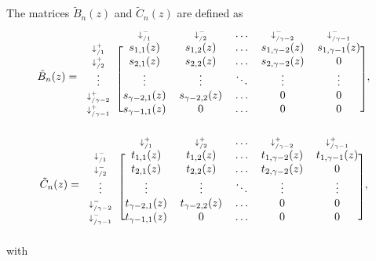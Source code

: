 \documentclass{article}
\begin{document}
The matrices $\tilde{B}_n(z)$ and $\tilde{C}_n(z)$ are defined as
\begin{equation*}
\tilde{B}_n(z) = 
\begin{blockarray}{cccccc}
   & \scriptstyle{\downarrow_{/1}^-} & \scriptstyle{\downarrow_{/2}^-} &
   \ldots & \scriptstyle{\downarrow_{/\gamma-2}^-} &
   \scriptstyle{\downarrow_{/\gamma-1}^-} \\
\begin{block}{c[ccccc]}
\scriptstyle{\downarrow_{/1}^+} & s_{1,1}(z) & s_{1,2}(z) &
    \ldots & s_{1,\gamma-2}(z) & s_{1,\gamma-1}(z) \\
\scriptstyle{\downarrow_{/2}^+} & s_{2,1}(z) & s_{2,2}(z) &
    \ldots & s_{2,\gamma-2}(z) & 0 \\
\vdots & \vdots & \vdots & \ddots & \vdots & \vdots \\
\scriptstyle{\downarrow_{/\gamma-2}^+} & s_{\gamma-2,1}(z) &
    s_{\gamma-2,2}(z) & \ldots & 0 & 0 \\
\scriptstyle{\downarrow_{/\gamma-1}^+} & s_{\gamma-1,1}(z) & 0 &
    \ldots & 0 & 0 \\
\end{block}
\end{blockarray},
\end{equation*}
\begin{equation*}
\tilde{C}_n(z) = 
\begin{blockarray}{cccccc}
   & \scriptstyle{\downarrow_{/1}^+} & \scriptstyle{\downarrow_{/2}^+} &
    \ldots & \scriptstyle{\downarrow_{/\gamma-2}^+} &
    \scriptstyle{\downarrow_{/\gamma-1}^+} \\
\begin{block}{c[ccccc]}
\scriptstyle{\downarrow_{/1}^-} & t_{1,1}(z) & t_{1,2}(z) &
    \ldots & t_{1,\gamma-2}(z) & t_{1,\gamma-1}(z) \\
\scriptstyle{\downarrow_{/2}^-} & t_{2,1}(z) & t_{2,2}(z) &
    \ldots & t_{2,\gamma-2}(z) & 0 \\
\vdots & \vdots & \vdots & \ddots & \vdots & \vdots \\
\scriptstyle{\downarrow_{/\gamma-2}^-} & t_{\gamma-2,1}(z) &
    t_{\gamma-2,2}(z) & \ldots & 0 & 0 \\
\scriptstyle{\downarrow_{/\gamma-1}^-} & t_{\gamma-1,1}(z) &
    0 & \ldots & 0 & 0 \\
\end{block}
\end{blockarray},
\end{equation*}
with
\end{document}
